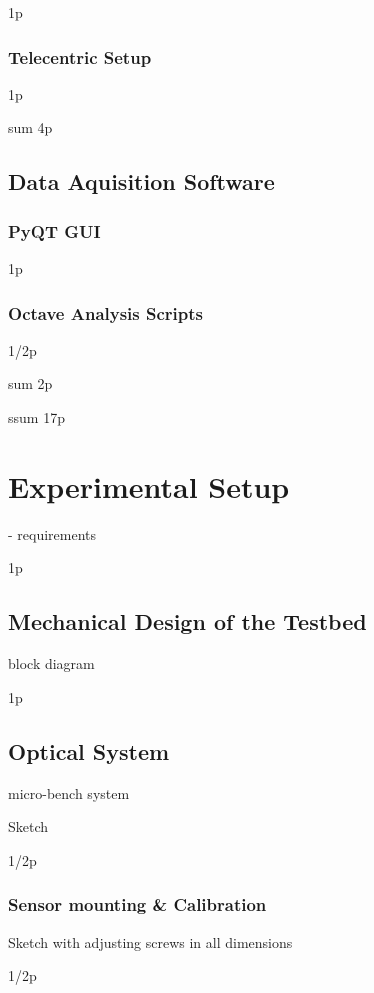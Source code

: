 \documentclass[12pt,a4paper]{article}
\begin{document}
1p

\subsubsection{Telecentric Setup}

1p

sum 4p

\subsection{Data Aquisition Software}

\subsubsection{PyQT GUI}
1p

\subsubsection{Octave Analysis Scripts}
1/2p


sum 2p

ssum 17p

\section{Experimental Setup}

- requirements

1p

\subsection{Mechanical Design of the Testbed}

block diagram

1p

\subsection{Optical System}

micro-bench system

Sketch

1/2p

\subsubsection{Sensor mounting & Calibration}

Sketch with adjusting screws in all dimensions

1/2p
\end{document}

